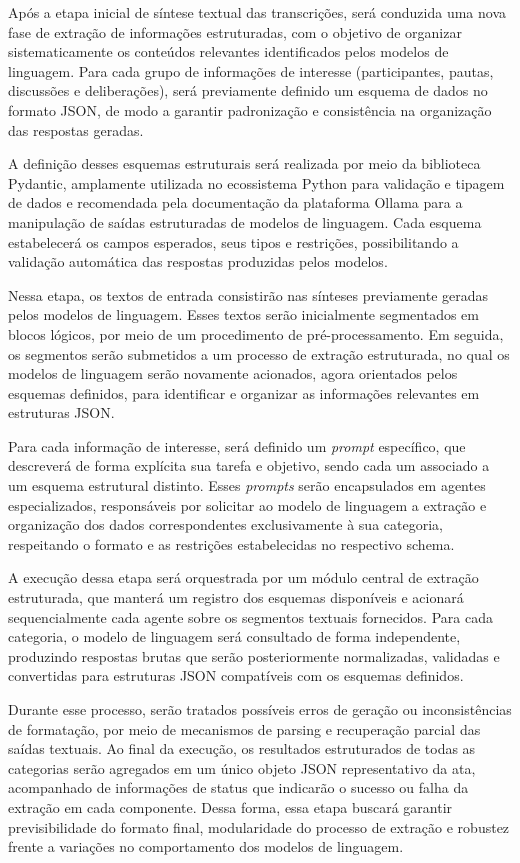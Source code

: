 Após a etapa inicial de síntese textual das transcrições, será conduzida uma nova fase de extração de informações estruturadas, com o objetivo de organizar sistematicamente os conteúdos relevantes identificados pelos modelos de linguagem. Para cada grupo de informações de interesse (participantes, pautas, discussões e deliberações), será previamente definido um esquema de dados no formato JSON, de modo a garantir padronização e consistência na organização das respostas geradas.

A definição desses esquemas estruturais será realizada por meio da biblioteca Pydantic, amplamente utilizada no ecossistema Python para validação e tipagem de dados e recomendada pela documentação da plataforma Ollama para a manipulação de saídas estruturadas de modelos de linguagem. Cada esquema estabelecerá os campos esperados, seus tipos e restrições, possibilitando a validação automática das respostas produzidas pelos modelos.

Nessa etapa, os textos de entrada consistirão nas sínteses previamente geradas pelos modelos de linguagem. Esses textos serão inicialmente segmentados em blocos lógicos, por meio de um procedimento de pré-processamento. Em seguida, os segmentos serão submetidos a um processo de extração estruturada, no qual os modelos de linguagem serão novamente acionados, agora orientados pelos esquemas definidos, para identificar e organizar as informações relevantes em estruturas JSON.

Para cada informação de interesse, será definido um \textit{prompt} específico, que descreverá de forma explícita sua tarefa e objetivo, sendo cada um associado a um esquema estrutural distinto. Esses \textit{prompts} serão encapsulados em agentes especializados, responsáveis por solicitar ao modelo de linguagem a extração e organização dos dados correspondentes exclusivamente à sua categoria, respeitando o formato e as restrições estabelecidas no respectivo schema.

A execução dessa etapa será orquestrada por um módulo central de extração estruturada, que manterá um registro dos esquemas disponíveis e acionará sequencialmente cada agente sobre os segmentos textuais fornecidos. Para cada categoria, o modelo de linguagem será consultado de forma independente, produzindo respostas brutas que serão posteriormente normalizadas, validadas e convertidas para estruturas JSON compatíveis com os esquemas definidos.

Durante esse processo, serão tratados possíveis erros de geração ou inconsistências de formatação, por meio de mecanismos de parsing e recuperação parcial das saídas textuais. Ao final da execução, os resultados estruturados de todas as categorias serão agregados em um único objeto JSON representativo da ata, acompanhado de informações de status que indicarão o sucesso ou falha da extração em cada componente. Dessa forma, essa etapa buscará garantir previsibilidade do formato final, modularidade do processo de extração e robustez frente a variações no comportamento dos modelos de linguagem.

